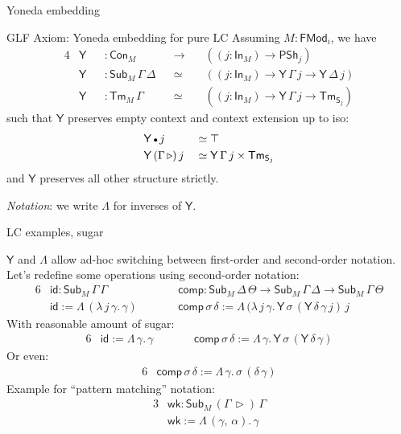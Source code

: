 \documentclass[dvipsnames,aspectratio=169]{beamer}
\newcommand{\ms}[1]{\mathsf{#1}}
\newcommand{\Con}{\mathsf{Con}}
\newcommand{\Sub}{\mathsf{Sub}}
\newcommand{\Tm}{\mathsf{Tm}}
\newcommand{\Y}{\mathsf{Y}}
\newcommand{\In}{\mathsf{In}}
\newcommand{\PSh}{\mathsf{PSh}}
\newcommand{\FMod}{\mathsf{FMod}}
\newcommand{\ext}{\triangleright}
\newcommand{\emptycon}{\scaleobj{.75}\bullet}
\renewcommand{\S}{\mathsf{S}}
\begin{document}
\begin{frame}{Yoneda embedding}

\begin{block}{GLF Axiom: Yoneda embedding for pure LC}
Assuming $M : \FMod_i$, we have
\begin{alignat*}{4}
  & \Y && : \Con_M                 &&\to\,  &&((j : \In_M) \to \PSh_j) \\
  & \Y && : \Sub_M\,\Gamma\,\Delta &&\simeq &&((j : \In_M) \to \Y\,\Gamma\,j \to \Y\,\Delta\,j)\\
  & \Y && : \Tm_M\,\Gamma          &&\simeq &&((j : \In_M) \to \Y\,\Gamma\,j \to \Tm_{\S_j})
\end{alignat*}
such that $\Y$ preserves empty context and context extension up to iso:
\begin{alignat*}{4}
  & \Y\,\emptycon\,j &&\simeq \top \\
  & \Y\,(\Gamma\,\ext)\,j &&\simeq \Y\,\Gamma\,j \times \Tm_{\S_j}
\end{alignat*}
and $\Y$ preserves all other structure strictly.
\end{block}
\emph{Notation}: we write $\Lambda$ for inverses of $\Y$.
\end{frame}

\begin{frame}{LC examples, sugar}

$\Y$ and $\Lambda$ allow ad-hoc switching between first-order and second-order notation.
Let's redefine some operations using second-order notation:
\begin{alignat*}{6}
  & \ms{id} : \Sub_M\,\Gamma\,\Gamma && \ms{comp} : \Sub_M\,\Delta\,\Theta \to \Sub_M\,\Gamma\,\Delta \to \Sub_M\,\Gamma\,\Theta\\
  & \ms{id} := \Lambda\,(\lambda\,j\,\gamma.\,\gamma)\quad\quad && \ms{comp}\,\sigma\,\delta := \Lambda\,(\lambda\,j\,\gamma.\,\Y\,\sigma\,(\Y\,\delta\,\gamma\,j)\,j
\end{alignat*}
With reasonable amount of sugar:
\begin{alignat*}{6}
  & \ms{id} := \Lambda\,\gamma.\,\gamma\quad\quad && \ms{comp}\,\sigma\,\delta := \Lambda\,\gamma.\,\Y\,\sigma\,(\Y\,\delta\,\gamma)
\end{alignat*}
Or even:
\begin{alignat*}{6}
  &\ms{comp}\,\sigma\,\delta := \Lambda\,\gamma.\,\sigma\,(\delta\,\gamma)
\end{alignat*}
Example for ``pattern matching'' notation:
\begin{alignat*}{3}
  & \ms{wk} : \Sub_M\,(\Gamma\,\ext)\,\Gamma \\
  & \ms{wk} := \Lambda\,(\gamma,\,\alpha).\,\gamma
\end{alignat*}

\end{frame}
\end{document}
